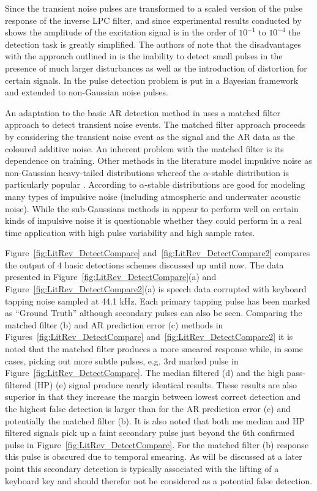 Since the transient noise pulses are transformed to a scaled version of the pulse response of the inverse LPC filter, and since experimental results conducted by \cite{Vaseghi1990} shows the amplitude of the excitation signal is in the order of $10^{-1}$ to $10^{-4}$ the detection task is greatly simplified. The authors of \cite{Godsill1998} note that the disadvantages with the approach outlined in \cite{Vaseghi1990} is the inability to detect small pulses in the presence of much larger disturbances as well as the introduction of distortion for certain signals. In \cite{Godsill1998} the pulse detection problem is put in a Bayesian framework and extended to non-Gaussian noise pulses.

An adaptation to the basic AR detection method in \cite{Vaseghi1988} uses a matched filter approach to detect transient noise events. The matched filter approach proceeds by considering the transient noise event as the signal and the AR data as the coloured additive noise\cite{Godsill1998book}. An inherent problem with the matched filter is its dependence on training. Other methods in the literature model impulsive noise as non-Gaussian heavy-tailed distributions whereof the $\alpha$-stable distribution is particularly popular \cite{Tsihrintzis1997}\cite{Coates2002}. According to \cite{Nikias1995} $\alpha$-stable distributions are good for modeling many types of impulsive noise (including atmospheric and underwater acoustic noise). While the sub-Gaussians methods in \cite{Tsihrintzis1997}\cite{Coates2002} appear to perform well on certain kinds of impulsive noise it is questionable whether they could perform in a real time application with high pulse variability and high sample rates.

Figure~\ref{fig:LitRev_DetectCompare} and~\ref{fig:LitRev_DetectCompare2} compares the output of 4 basic detections schemes discussed up until now. The data presented in Figure~\ref{fig:LitRev_DetectCompare}(a) and Figure~\ref{fig:LitRev_DetectCompare2}(a) is speech data corrupted with keyboard tapping noise sampled at 44.1 kHz. Each primary tapping pulse has been marked as ``Ground Truth'' although secondary pulses can also be seen. Comparing the matched filter (b) and AR prediction error (c) methods in Figures~\ref{fig:LitRev_DetectCompare} and~\ref{fig:LitRev_DetectCompare2} it is noted that the matched filter produces a more smeared response while, in some cases, picking out more subtle pulses\cite{Godsill1998book}, e.g. 3rd marked pulse in Figure~\ref{fig:LitRev_DetectCompare}. The median filtered (d) and the high pass-filtered (HP) (e) signal produce nearly identical results. These results are also superior in that they increase the margin between lowest correct detection and the highest false detection is larger than for the AR prediction error (c) and potentially the matched filter (b). It is also noted that both me median and HP filtered signals pick up a faint secondary pulse just beyond the 6th confirmed pulse in Figure~\ref{fig:LitRev_DetectCompare}. For the matched filter (b) response this pulse is obscured due to temporal smearing. As will be discussed at a later point this secondary detection is typically associated with the lifting of a keyboard key and should therefor not be considered as a potential false detection.

